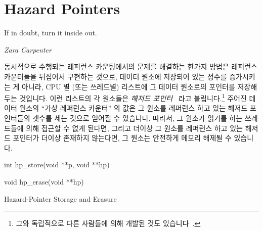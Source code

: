 
\section{Hazard Pointers}
\label{sec:defer:Hazard Pointers}
%
\epigraph{If in doubt, turn it inside out.}{\emph{Zara Carpenter}}

동시적으로 수행되는 레퍼런스 카운팅에서의 문제를 해결하는 한가지 방법은
레퍼런스 카운터들을 뒤집어서 구현하는 것으로,
데이터 원소에 저장되어 있는 정수를 증가시키는 게 아니라, CPU 별 (또는 쓰레드별)
리스트에 그 데이터 원소로의 포인터를 저장해 두는 것입니다.
이런 리스트의 각 원소들은 \emph{해저드 포인터}~\cite{MagedMichael04a} 라고
불립니다.\footnote{
	그와 독립적으로 다른 사람들에 의해 개발된 것도
	있습니다~\cite{HerlihyLM02}.}
주어진 데이터 원소의 ``가상 레퍼런스 카운터'' 의 값은 그 원소를 레퍼런스 하고
있는 해저드 포인터들의 갯수를 세는 것으로 얻어질 수 있습니다.
따라서, 그 원소가 읽기를 하는 쓰레드들에 의해 접근할 수 없게 된다면, 그리고
더이상 그 원소를 레퍼런스 하고 있는 해저드 포인터가 더이상 존재하지 않는다면,
그 원소는 안전하게 메모리 해제될 수 있습니다.

\begin{listing}[btp]
\begin{linelabel}
\begin{VerbatimL}[commandchars=\\\[\]]
int hp_store(void **p, void **hp)						\lnlbl[store:e]

void hp_erase(void **hp)							\lnlbl[erase:e]
\end{VerbatimL}
\end{linelabel}
\caption{Hazard-Pointer Storage and Erasure}
\label{lst:defer:Hazard-Pointer Storage and Erasure}
\end{listing}

